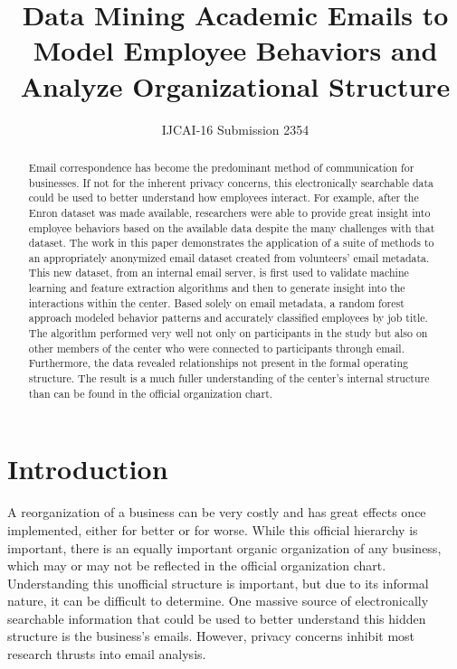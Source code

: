 \documentclass[10pt,twocolumn,conference]{IEEEtran}
\begin{document}
\title{Data Mining Academic Emails to Model Employee Behaviors and Analyze Organizational Structure}
\author{IJCAI-16 Submission 2354}
\maketitle

\begin{abstract}
Email correspondence has become the predominant method of communication for businesses.  If not for the inherent privacy concerns, this electronically searchable data could be used to better understand how employees interact. For example, after the Enron dataset was made available, researchers were able to provide great insight into employee behaviors based on the available data despite the many challenges with that dataset.  The work in this paper demonstrates the application of a suite of methods to an appropriately anonymized email dataset created from volunteers' email metadata.  This new dataset, from an internal email server, is first used to validate machine learning and feature extraction algorithms and then to generate insight into the interactions within the center.  Based solely on email metadata, a random forest approach modeled behavior patterns and accurately classified employees by job title.  The algorithm performed very well not only on participants in the study but also on other members of the center who were connected to participants through email.  Furthermore, the data revealed relationships not present in the formal operating structure.  The result is a much fuller understanding of the center's internal structure than can be found in the official organization chart.
\end{abstract}

\section{Introduction}
A reorganization of a business can be very costly and has great effects once implemented, either for better or for worse.  While this official hierarchy is important, there is an equally important organic organization of any business, which may or may not be reflected in the official organization chart.  Understanding this unofficial structure is important, but due to its informal nature, it can be difficult to determine.  One massive source of electronically searchable information that could be used to better understand this hidden structure is the business's emails.  However, privacy concerns inhibit most research thrusts into email analysis.  
\end{document}
